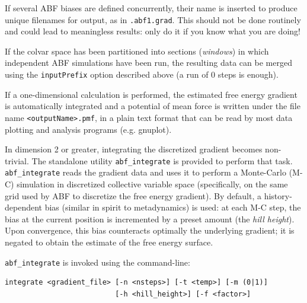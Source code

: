If several ABF biases are defined concurrently, their name is inserted to produce
unique filenames for output, as in \outputName\texttt{.abf1.grad}.
This should not be done routinely and could lead to meaningless results:
only do it if you know what you are doing!

If the colvar space has been partitioned into sections (\emph{windows}) in which independent
ABF simulations have been run, the resulting data can be merged using the
\texttt{inputPrefix} option described above (a run of 0 steps is enough).



If a one-dimensional calculation is performed, the estimated free energy
gradient is automatically integrated and a potential of mean force is written
under the file name \texttt{<outputName>.pmf}, in a plain text format that
can be read by most data plotting and analysis programs (e.g. gnuplot).

In dimension 2 or greater, integrating the discretized gradient becomes non-trivial. The
standalone utility \texttt{abf\_integrate} is provided to perform that task.
\texttt{abf\_integrate} reads the gradient data and uses it to perform a Monte-Carlo (M-C)
simulation in discretized collective variable space (specifically, on the same grid
used by ABF to discretize the free energy gradient).
By default, a history-dependent bias (similar in spirit to metadynamics) is used:
at each M-C step, the bias at the current position is incremented by a preset amount
(the \emph{hill height}).
Upon convergence, this bias counteracts optimally the underlying gradient;
it is negated to obtain the estimate of the free energy surface.

\texttt{abf\_integrate} is invoked using the command-line:
{\small
\begin{verbatim}
integrate <gradient_file> [-n <nsteps>] [-t <temp>] [-m (0|1)]
                          [-h <hill_height>] [-f <factor>]
\end{verbatim}
}

